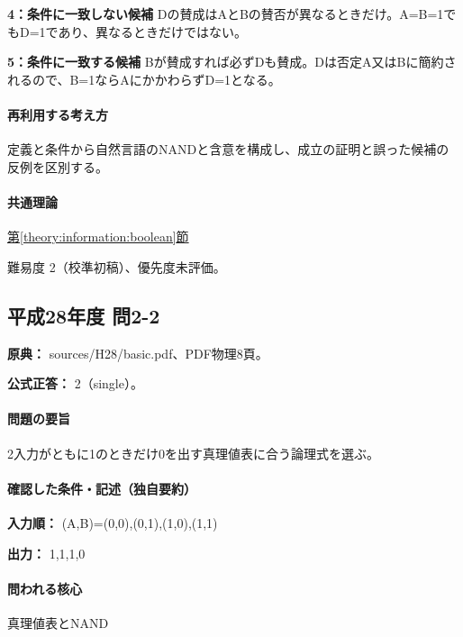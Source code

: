 \noindent\textbf{4：条件に一致しない候補} Dの賛成はAとBの賛否が異なるときだけ。A=\allowbreak{}B=\allowbreak{}1でもD=\allowbreak{}1であり、異なるときだけではない。\par

\noindent\textbf{5：条件に一致する候補} Bが賛成すれば必ずDも賛成。Dは否定A又はBに簡約されるので、B=\allowbreak{}1ならAにかかわらずD=\allowbreak{}1となる。\par

\paragraph{再利用する考え方} 定義と条件から自然言語のNANDと含意を構成し、成立の証明と誤った候補の反例を区別する。

\paragraph{共通理論} \hyperref[theory:information:boolean]{第\ref*{theory:information:boolean}節}

\par 難易度 2（校準初稿）、優先度未評価。

\subsection{平成28年度 問2-2}
\label{q:h28-reg-basic-2-2}

\noindent\textbf{原典：} sources/H28/basic.pdf、PDF物理8頁。

\textbf{公式正答：} 2（single）。

\paragraph{問題の要旨} 2入力がともに1のときだけ0を出す真理値表に合う論理式を選ぶ。

\paragraph{確認した条件・記述（独自要約）}\mbox{}\par

\noindent\textbf{入力順：} (A,B)=\allowbreak{}(0,0),(0,1),(1,0),(1,1)\par

\noindent\textbf{出力：} 1,1,1,0\par

\paragraph{問われる核心} 真理値表とNAND

